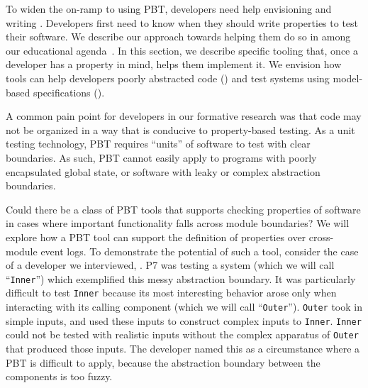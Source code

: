%
To widen the on-ramp to using PBT, developers need help envisioning and
writing . Developers first need to know when they
should write properties to test their software. We describe our approach towards
helping them do so in among our educational agenda~. In
this section, we describe specific tooling that, once a developer has a property
in mind, helps them implement it. We envision how tools can help developers
poorly abstracted code () and test systems using
model-based specifications ().

A common pain point for developers in our formative research
was that code may not be organized in a way that is conducive to property-based
testing. As a unit testing technology, PBT requires ``units'' of software to
test with clear boundaries. As such, PBT cannot easily apply to programs with
poorly encapsulated global state, or software with leaky or complex abstraction
boundaries.

Could there be a class of PBT tools that supports checking properties of
software in cases where important functionality falls across module boundaries?
We will explore how a PBT tool can support the definition of properties over
cross-module event logs. To demonstrate the potential of such a tool, consider
the case of a developer we interviewed, . P7 was testing
a system (which we will call ``\lstinline{Inner}'') which exemplified this messy
abstraction
boundary. It was particularly difficult to test \lstinline{Inner} because
its most interesting behavior arose only when interacting with its calling
component (which we will call ``\lstinline{Outer}'').
\lstinline{Outer} took in simple inputs, and used these inputs to construct
complex inputs to \lstinline{Inner}. \lstinline{Inner} could not be tested with
realistic inputs without the complex apparatus of \lstinline{Outer} that
produced those inputs. The developer named this as a circumstance where a
PBT is difficult to apply, because the abstraction boundary between the
components is too fuzzy.

